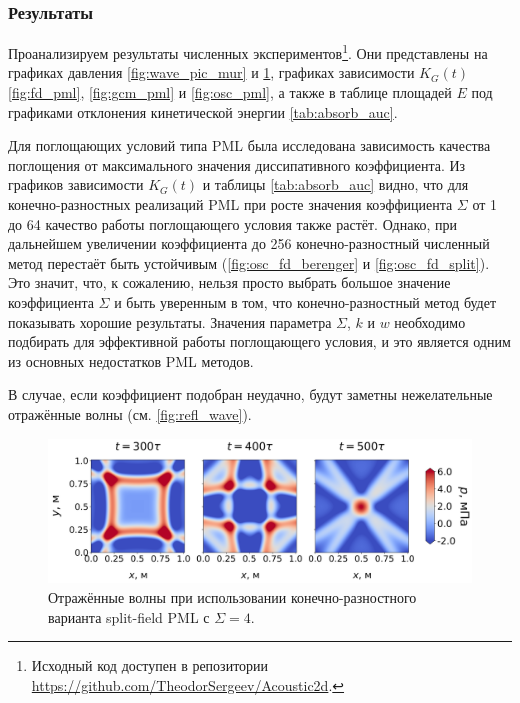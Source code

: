 \subsubsection{Результаты}

Проанализируем результаты численных экспериментов\footnote{Исходный код доступен в репозитории \url{https://github.com/TheodorSergeev/Acoustic2d}.}. Они представлены на графиках давления \ref{fig:wave_pic_mur} и \ref{fig:refl_wave}, графиках зависимости $K_G(t)$ \ref{fig:fd_pml}, \ref{fig:gcm_pml} и \ref{fig:osc_pml}, а также в таблице площадей $E$ под графиками отклонения  кинетической энергии \autoref{tab:absorb_auc}.

Для поглощающих условий типа PML была исследована зависимость качества поглощения от максимального значения диссипативного коэффициента. Из графиков зависимости $K_G(t)$ и таблицы \ref{tab:absorb_auc} видно, что для конечно-разностных реализаций PML при росте значения коэффициента $\Sigma$ от 1 до 64 качество работы поглощающего условия также растёт. Однако, при дальнейшем увеличении коэффициента до 256 конечно-разностный численный метод перестаёт быть устойчивым (\autoref{fig:osc_fd_berenger} и \autoref{fig:osc_fd_split}). Это значит, что, к сожалению, нельзя просто выбрать большое значение коэффициента $\Sigma$ и быть уверенным в том, что конечно-разностный метод будет показывать хорошие результаты. Значения параметра $\Sigma$, $k$ и $w$ необходимо подбирать для эффективной работы поглощающего условия, и это является одним из основных недостатков PML методов.

В случае, если коэффициент подобран неудачно, будут заметны нежелательные отражённые волны (см. \autoref{fig:refl_wave}).

\begin{figure}[H]
    \centering
    \includegraphics[width=1.0\textwidth]{images/pml/wave_pic_fd_split_pml_1.png}
    \caption{Отражённые волны при использовании конечно-разностного варианта split-field PML с $\Sigma=4$.}
    \label{fig:refl_wave}
\end{figure}

